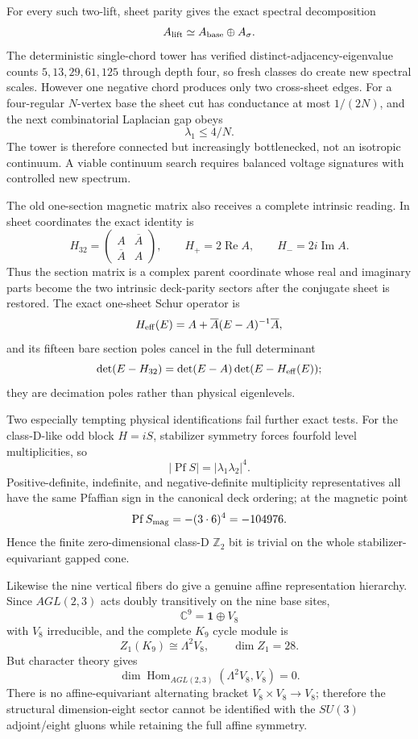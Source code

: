 For every such two-lift, sheet parity gives the exact spectral decomposition
\[
A_{\rm lift}\simeq A_{\rm base}\oplus A_\sigma.
\]
The deterministic single-chord tower has verified distinct-adjacency-eigenvalue
counts $5,13,29,61,125$ through depth four, so fresh classes do create new
spectral scales.  However one negative chord produces only two cross-sheet edges.
For a four-regular $N$-vertex base the sheet cut has conductance at most
$1/(2N)$, and the next combinatorial Laplacian gap obeys
\[
\boxed{\lambda_1\le 4/N.}
\]
The tower is therefore connected but increasingly bottlenecked, not an isotropic
continuum.  A viable continuum search requires balanced voltage signatures with
controlled new spectrum.

The old one-section magnetic matrix also receives a complete intrinsic reading.
In sheet coordinates the exact identity is
\[
\boxed{
H_{32}=\begin{pmatrix}A&\overline A\\\overline A&A\end{pmatrix},
\qquad H_+=2\operatorname{Re}A,
\qquad H_-=2i\operatorname{Im}A.
}
\]
Thus the section matrix is a complex parent coordinate whose real and imaginary
parts become the two intrinsic deck-parity sectors after the conjugate sheet is
restored.  The exact one-sheet Schur operator is
\[
H_{\rm eff}(E)=A+\overline A(E-A)^{-1}\overline A,
\]
and its fifteen bare section poles cancel in the full determinant
\[
\det(E-H_{32})=\det(E-A)\det(E-H_{\rm eff}(E));
\]
they are decimation poles rather than physical eigenlevels.

Two especially tempting physical identifications fail further exact tests.  For
the class-D-like odd block $H=iS$, stabilizer symmetry forces fourfold level
multiplicities, so
\[
|\operatorname{Pf}S|=|\lambda_1\lambda_2|^4.
\]
Positive-definite, indefinite, and negative-definite multiplicity representatives
all have the same Pfaffian sign in the canonical deck ordering; at the magnetic
point
\[
\operatorname{Pf}S_{\rm mag}=-(3\cdot6)^4=-104976.
\]
Hence the finite zero-dimensional class-D $\mathbb Z_2$ bit is trivial on the
whole stabilizer-equivariant gapped cone.

Likewise the nine vertical fibers do give a genuine affine representation
hierarchy.  Since $AGL(2,3)$ acts doubly transitively on the nine base sites,
\[
\mathbb C^9=\mathbf1\oplus V_8
\]
with $V_8$ irreducible, and the complete $K_9$ cycle module is
\[
Z_1(K_9)\cong\Lambda^2V_8,\qquad \dim Z_1=28.
\]
But character theory gives
\[
\boxed{
\dim\operatorname{Hom}_{AGL(2,3)}(\Lambda^2V_8,V_8)=0.
}
\]
There is no affine-equivariant alternating bracket $V_8\times V_8\to V_8$;
therefore the structural dimension-eight sector cannot be identified with the
$SU(3)$ adjoint/eight gluons while retaining the full affine symmetry.

